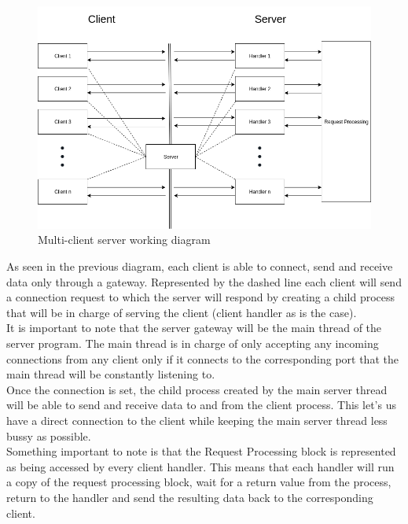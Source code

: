 \documentclass[a4paper,12pt]{article}
\begin{document}
	\vspace{1cm}
	
	\begin{figure}[h]
		\centering
		\includegraphics[width=\textwidth]{multiclientdiagram.png}
		\caption{Multi-client server working diagram}
	\end{figure}	
	
	As seen in the previous diagram, each client is able to connect, send and receive data only through a gateway. Represented by the dashed line each client will send a connection request to which the server will respond by creating a child process that will be in charge of serving the client (client handler as is the case).\\
	
	It is important to note that the server gateway will be the main thread of the server program. The main thread is in charge of only accepting any incoming connections from any client only if it connects to the corresponding port that the main thread will be constantly listening to.\\
	
	Once the connection is set, the child process created by the main server thread will be able to send and receive data to and from the client process. This let's us have a direct connection to the client while keeping the main server thread less bussy as possible.\\
	
	Something important to note is that the Request Processing block is represented as being accessed by every client handler. This means that each handler will run a copy of the request processing block, wait for a return value from the process, return to the handler and send the resulting data back to the corresponding client.\\
	
\end{document}
